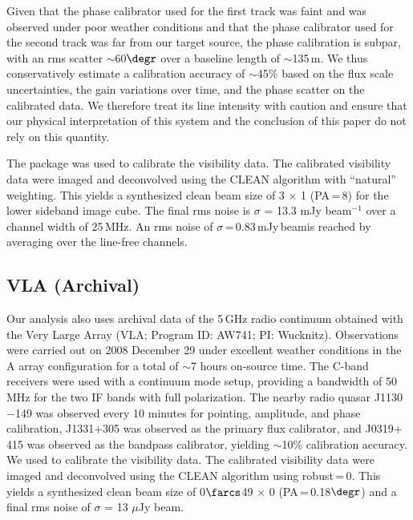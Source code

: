 \documentclass[]{emulateapj}
\begin{document}
%
%
Given that the phase calibrator used for the first track was faint and was
observed under poor weather conditions and that the phase calibrator used for
the second track was far from our target source, the phase calibration is
subpar, with an rms scatter $\sim$60$\degr$ over a baseline length of $\sim$135\,m.
We thus conservatively estimate
a calibration accuracy of $\sim$45\% based on the flux scale uncertainties,
the gain variations over time, and the phase scatter on the calibrated data. We
therefore treat its line intensity with caution and ensure that our physical interpretation
of this system and the conclusion of this paper do not rely on this quantity.

The  package was used to calibrate the visibility data.
The calibrated visibility data were
imaged and deconvolved using the CLEAN algorithm with ``natural'' weighting. This yields a synthesized clean
beam size of 3 $\times$ 1 (PA\,=\,8\degr) for the lower sideband
image cube. The final rms noise is $\sigma$ = 13.3 mJy beam$^{-1}$
over a channel width of 25\,MHz. An rms noise of
$\sigma$\,=\,0.83\,mJy\,beam\pmOne is reached by averaging over the
line-free channels.

\subsection{VLA (Archival)} %
Our analysis also uses archival data of the 5\,GHz
radio continuum obtained with the
Very Large Array (VLA; Program ID: AW741; PI: Wucknitz).
Observations were carried out on 2008 December 29 under excellent weather
conditions in the A array configuration for a total of $\sim$7 hours on-source time. The C-band receivers were used with a continuum mode setup,
providing a bandwidth of 50 MHz for the two IF bands with full polarization.
The nearby radio quasar J1130$-$149 was observed every 10 minutes for
pointing, amplitude, and phase calibration, J1331$+$305 was observed as the
primary flux calibrator, and J0319$+$415 was observed as the bandpass
calibrator, yielding $\sim$10\% calibration accuracy.
We used  to calibrate the visibility data.
The calibrated visibility data were imaged and deconvolved using
the CLEAN algorithm using robust\,=\,0. This yields a synthesized clean
beam size of 0$\farcs$49 $\times$ 0 (PA\,=\,0.18$\degr$) and a final
rms noise of $\sigma$ = 13 $\mu$Jy beam\pmOne.
\end{document}
